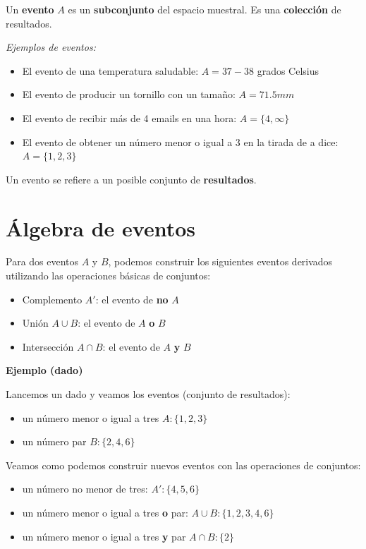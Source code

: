 \documentclass[
]{book}
\providecommand{\tightlist}{%
  \setlength{\itemsep}{0pt}\setlength{\parskip}{0pt}}
\begin{document}
Un \textbf{evento} \(A\) es un \textbf{subconjunto} del espacio muestral. Es una \textbf{colección} de resultados.

\emph{Ejemplos de eventos:}

\begin{itemize}
\tightlist
\item
  El evento de una temperatura saludable: \(A=37-38\) grados Celsius
\item
  El evento de producir un tornillo con un tamaño: \(A=71.5mm\)
\item
  El evento de recibir más de 4 emails en una hora: \(A=\{4, \infty \}\)
\item
  El evento de obtener un número menor o igual a 3 en la tirada de a dice: \(A=\{1,2,3\}\)
\end{itemize}

Un evento se refiere a un posible conjunto de \textbf{resultados}.

\hypertarget{uxe1lgebra-de-eventos}{%
\section{Álgebra de eventos}\label{uxe1lgebra-de-eventos}}

Para dos eventos \(A\) y \(B\), podemos construir los siguientes eventos derivados utilizando las operaciones básicas de conjuntos:

\begin{itemize}
\tightlist
\item
  Complemento \(A'\): el evento de \textbf{no} \(A\)
\item
  Unión \(A \cup B\): el evento de \(A\) \textbf{o} \(B\)
\item
  Intersección \(A \cap B\): el evento de \(A\) \textbf{y} \(B\)
\end{itemize}

\textbf{Ejemplo (dado)}

Lancemos un dado y veamos los eventos (conjunto de resultados):

\begin{itemize}
\tightlist
\item
  un número menor o igual a tres \(A:\{1,2,3\}\)
\item
  un número par \(B:\{2,4,6\}\)
\end{itemize}

Veamos como podemos construir nuevos eventos con las operaciones de conjuntos:

\begin{itemize}
\tightlist
\item
  un número no menor de tres: \(A':\{4,5,6\}\)
\item
  un número menor o igual a tres \textbf{o} par: \(A \cup B: \{1,2,3,4,6\}\)
\item
  un número menor o igual a tres \textbf{y} par \(A \cap B: \{2\}\)
\end{itemize}
\end{document}
